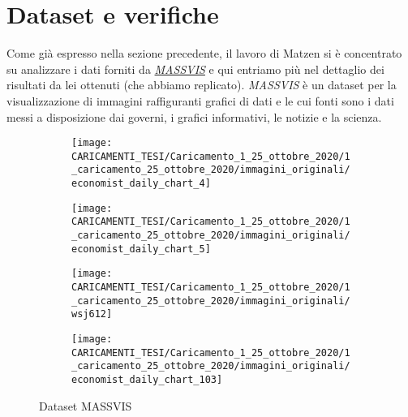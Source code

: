 \documentclass[%
	corpo=12pt,
    twoside,
    stile=classica,
    oldstyle,
    tipotesi=custom,
    greek,
    evenboxes,
]{toptesi}
\begin{document}
{\section{Dataset e verifiche}
Come già espresso nella sezione precedente, il lavoro di Matzen si è concentrato su analizzare i dati forniti da \href{http://massvis.mit.edu}{\textit{MASSVIS}} e qui entriamo più nel dettaglio dei risultati da lei ottenuti (che abbiamo replicato). \textit{MASSVIS} è un dataset per la visualizzazione di immagini raffiguranti grafici di dati e le cui fonti sono i dati messi a disposizione dai governi, i grafici informativi, le notizie e la scienza.

\begin{figure}[!htb]\centering
\begin{subfigure}
\centering
\texttt{[image: CARICAMENTI\_TESI/Caricamento\_1\_25\_ottobre\_2020/1\_caricamento\_25\_ottobre\_2020/immagini\_originali/economist\_daily\_chart\_4]}
\end{subfigure}
\begin{subfigure}
\centering
\texttt{[image: CARICAMENTI\_TESI/Caricamento\_1\_25\_ottobre\_2020/1\_caricamento\_25\_ottobre\_2020/immagini\_originali/economist\_daily\_chart\_5]}
\end{subfigure}
\begin{subfigure}
\centering
\texttt{[image: CARICAMENTI\_TESI/Caricamento\_1\_25\_ottobre\_2020/1\_caricamento\_25\_ottobre\_2020/immagini\_originali/wsj612]}
\end{subfigure}
\begin{subfigure}
\centering
\texttt{[image: CARICAMENTI\_TESI/Caricamento\_1\_25\_ottobre\_2020/1\_caricamento\_25\_ottobre\_2020/immagini\_originali/economist\_daily\_chart\_103]}
\end{subfigure}
\caption{Dataset MASSVIS}\label{fig: economist_daily_chart_4}
\end{figure}



}
\end{document}
